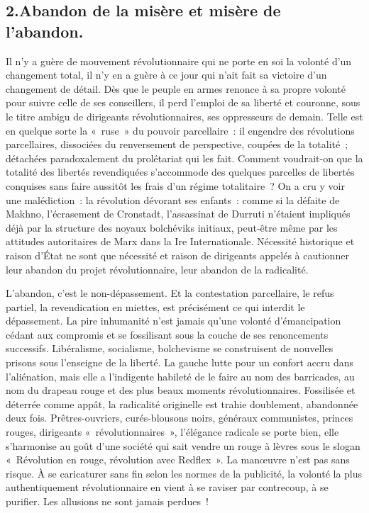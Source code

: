 \documentclass[french,twoside]{book} %
\begin{document}
\subsection[{2.Abandon de la misère et misère de l’abandon.}]{\textsc{2.}Abandon de la misère et misère de l’abandon.}
\noindent Il n’y a guère de mouvement révolutionnaire qui ne porte en soi la volonté d’un changement total, il n’y en a guère à ce jour qui n’ait fait sa victoire d’un changement de détail. Dès que le peuple en armes renonce à sa propre volonté pour suivre celle de ses conseillers, il perd l’emploi de sa liberté et couronne, sous le titre ambigu de dirigeants révolutionnaires, ses oppresseurs de demain. Telle est en quelque sorte la « ruse » du pouvoir parcellaire : il engendre des révolutions parcellaires, dissociées du renversement de perspective, coupées de la totalité ; détachées paradoxalement du prolétariat qui les fait. Comment voudrait-on que la totalité des libertés revendiquées s’accommode des quelques parcelles de libertés conquises sans faire aussitôt les frais d’un régime totalitaire ? On a cru y voir une malédiction : la révolution dévorant ses enfants : comme si la défaite de Makhno, l’écrasement de Cronstadt, l’assassinat de Durruti n’étaient impliqués déjà par la structure des noyaux bolchéviks initiaux, peut-être même par les attitudes autoritaires de Marx dans la Ire Internationale. Nécessité historique et raison d’État ne sont que nécessité et raison de dirigeants appelés à cautionner leur abandon du projet révolutionnaire, leur abandon de la radicalité.\par
L’abandon, c’est le non-dépassement. Et la contestation parcellaire, le refus partiel, la revendication en miettes, est précisément ce qui interdit le dépassement. La pire inhumanité n’est jamais qu’une volonté d’émancipation cédant aux compromis et se fossilisant sous la couche de ses renoncements successifs. Libéralisme, socialisme, bolchevisme se construisent de nouvelles prisons sous l’enseigne de la liberté. La gauche lutte pour un confort accru dans l’aliénation, mais elle a l’indigente habileté de le faire au nom des barricades, au nom du drapeau rouge et des plus beaux moments révolutionnaires. Fossilisée et déterrée comme appât, la radicalité originelle est trahie doublement, abandonnée deux fois. Prêtres-ouvriers, curés-blousons noirs, généraux communistes, princes rouges, dirigeants « révolutionnaires », l’élégance radicale se porte bien, elle s’harmonise au goût d’une société qui sait vendre un rouge à lèvres sous le slogan « Révolution en rouge, révolution avec Redflex ». La manœuvre n’est pas sans risque. À se caricaturer sans fin selon les normes de la publicité, la volonté la plus authentiquement révolutionnaire en vient à se raviser par contrecoup, à se purifier. Les allusions ne sont jamais perdues !\par
\end{document}
